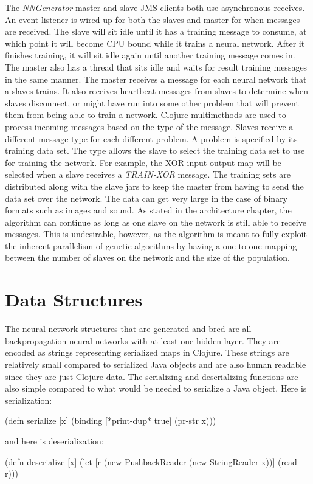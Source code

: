 The {\em NNGenerator} master and slave JMS clients both use asynchronous receives.
An event listener is wired up for both the slaves and master for when messages are received. 
The slave will sit idle until it has a training message to consume, at which point it will become CPU bound while it trains a neural network.
After it finishes training, it will sit idle again until another training message comes in.
The master also has a thread that sits idle and waits for result training messages in the same manner.
The master receives a message for each neural network that a slaves trains. 
It also receives heartbeat messages from slaves to determine when slaves disconnect, or might have run into some other problem that will prevent them from being able to train a network. 
Clojure multimethods are used to process incoming messages based on the type of the message. 
Slaves receive a different message type for each different problem. A problem is specified by its training data set. 
The type allows the slave to select the training data set to use for training the network. 
For example, the XOR input output map will be selected when a slave receives a {\em TRAIN-XOR} message. 
The training sets are distributed along with the slave jars to keep the master from having to send the data set over the network. 
The data can get very large in the case of binary formats such as images and sound. 
As stated in the architecture chapter, the algorithm can continue as long as one slave on the network is still able to receive messages. 
This is undesirable, however, as the algorithm is meant to fully exploit the inherent parallelism of genetic algorithms by having a one to one mapping between the number of slaves on the network and the size of the population. 

\section{Data Structures}
The neural network structures that are generated and bred are all backpropagation neural networks with at least one hidden layer. 
They are encoded as strings representing serialized maps in Clojure. 
These strings are relatively small compared to serialized Java objects and are also human readable since they are just Clojure data. 
The serializing and deserializing functions are also simple compared to what would be needed to serialize a Java object. Here is serialization: 

(defn serialize [x]
  (binding [*print-dup* true] (pr-str x)))

and here is deserialization:

(defn deserialize [x]
  (let [r (new PushbackReader (new StringReader x))]
    (read r)))


